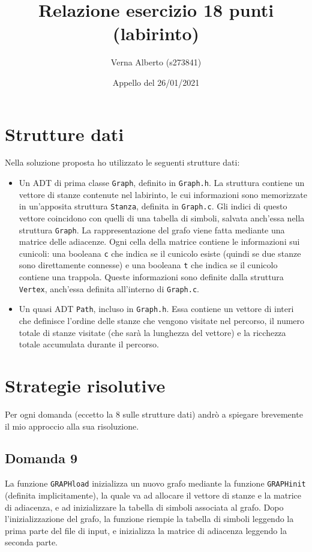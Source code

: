 \documentclass[a4paper]{article}
\title{Relazione esercizio 18 punti (labirinto)}
\author{Verna Alberto (s273841)}
\date{Appello del 26/01/2021}
\newcommand{\code}[1]{\texttt{#1}}
\begin{document}
    \maketitle

    \section{Strutture dati}
    Nella soluzione proposta ho utilizzato le seguenti strutture dati:
    \begin{itemize}
        \item Un ADT di prima classe \code{Graph}, definito in \code{Graph.h}. La struttura contiene un vettore di stanze contenute nel labirinto, le cui informazioni sono memorizzate in un'apposita struttura \code{Stanza}, definita in \code{Graph.c}. Gli indici di questo vettore coincidono con quelli di una tabella di simboli, salvata anch'essa nella struttura \code{Graph}. La rappresentazione del grafo viene fatta mediante una matrice delle adiacenze. Ogni cella della matrice contiene le informazioni sui cunicoli: una booleana \code{c} che indica se il cunicolo esiste (quindi se due stanze sono direttamente connesse) e una booleana \code{t} che indica se il cunicolo contiene una trappola. Queste informazioni sono definite dalla struttura \code{Vertex}, anch'essa definita all'interno di \code{Graph.c}.
        \item Un quasi ADT \code{Path}, incluso in \code{Graph.h}. Essa contiene un vettore di interi che definisce l'ordine delle stanze che vengono visitate nel percorso, il numero totale di stanze visitate (che sarà la lunghezza del vettore) e la ricchezza totale accumulata durante il percorso.
    \end{itemize}

    \section{Strategie risolutive}
    Per ogni domanda (eccetto la 8 sulle strutture dati) andrò a spiegare brevemente il mio approccio alla sua risoluzione.

    \subsection*{Domanda 9}
    La funzione \code{GRAPHload} inizializza un nuovo grafo mediante la funzione \code{GRAPHinit} (definita implicitamente), la quale va ad allocare il vettore di stanze e la matrice di adiacenza, e ad inizializzare la tabella di simboli associata al grafo. Dopo l'inizializzazione del grafo, la funzione riempie la tabella di simboli leggendo la prima parte del file di input, e inizializza la matrice di adiacenza leggendo la seconda parte.
\end{document}

